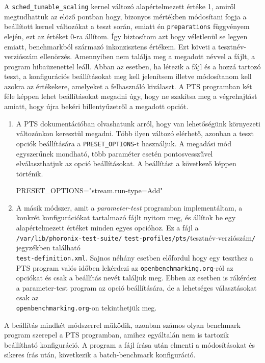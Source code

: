A \texttt{sched\_tunable\_scaling} kernel változó alapértelmezett értéke 1, amiről megtudhattuk az elöző pontban hogy, bizonyos mértékben módosítani fogja a beállított kernel változókat a teszt során, emiatt én \texttt{preparations} függvényem elején, ezt az értéket 0-ra állítom. Így biztosítom azt hogy véletlenül se legyen emiatt, benchmarkból származó inkonzisztens értékem.
Ezt követi a tesztnév-verziószám ellenörzés. Amennyiben nem találja meg a megadott névvel a fájlt, a program hibaüzenettel leáll.
Abban az esetben, ha létezik a fájl és a hozzá tartozó teszt, a konfigurációs beállításokat meg kell jelenítsem illetve módosítanom kell azokra az értékekere, amelyeket a felhasználó kiválaszt.
A PTS programban két féle képpen lehet beállításokat megadni úgy, hogy ne szakítsa meg a végrehajtást amiatt, hogy újra bekéri billentyűzetről a megadott opciót.
\begin{enumerate}
\item A PTS dokumentációban olvashatunk arról, hogy van lehetőségünk környezeti változónkon keresztül megadni. Több ilyen változó elérhető, azonban a teszt opciók beállítására a \texttt{PRESET\_OPTIONS}-t használjuk. A megadási mód egyszerűnek mondható, több paraméter esetén pontosvesszűvel elválaszthatjuk az opció beállításokat. A beállítást a következő képpen történik.
\begin{cpp}
PRESET\_OPTIONS="stream.run-type=Add"
\end{cpp}
\item A másik módszer, amit a \textit{parameter-test} programban implementáltam, a konkrét konfigurációkat tartalmazó fájlt nyitom meg, és állítok be egy alapértelmezett értéket minden egyes opcióhoz. Ez a fájl a \texttt{/var/lib/phoronix-test-suite/} \texttt{test-profiles/pts/}tesztnév-verziószám\texttt{/} jegyzékben található \\ \texttt{test-definition.xml}. Sajnos néhány esetben előfordul hogy egy teszthez a PTS program valós időben lekérdezi az \texttt{openbenchmarking.org}-ról az opciókat és csak a beállítás nevét találjuk meg. Ebben az esetben is rákérdez a parameter-test program az opció beállítására, de a lehetséges választásokat csak az \\ \texttt{openbenchmarking.org}-on tekinthetjük meg.
\end{enumerate}
A beállítás mindkét módszerrel müködik, azonban számos olyan benchmark program szerepel a PTS programban, amihez egyáltalán nem is tartozik beállítható konfiguráció. A program a fájl írása után elmenti a módosításokat és sikeres írás után, következik a batch-benchmark konfiguráció. 

